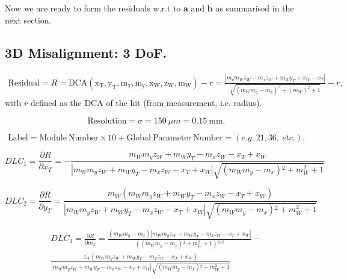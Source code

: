 \documentclass[a4paper,11pt]{article}
\begin{document}
Now we are ready to form the residuals w.r.t to $\textbf{a}$ and  $\textbf{b}$ as summarised in the next section.


\subsection{3D Misalignment: 3 DoF.}

\begin{equation}
\begin{split}
\mathrm{Residual} = R = \mathrm{DCA(x_T, y_T, m_x, m_y, x_W, z_W, m_W)} -r = \frac{| m_ym_Wz_W-m_xz_W + m_Wy_T + x_W - x_T |}{\sqrt{(m_W m_y-m_x)^2+(m_W)^2+1}} -r,
\end{split}
\end{equation}
with $r$ defined as the DCA of the hit (from measurement, i.e.  radius). 

\begin{equation}	
\mathrm{Resolution} = \sigma = 150 \ \mu m = 0.15 \ \mathrm{mm}.
\end{equation}

\begin{equation}	
\mathrm{Label}= \mathrm{Module \ Number} \times 10 + \mathrm{Global \ Parameter \ Number} = (e.g. \ 21, 36, \ etc.).
\end{equation}

\begin{equation}
DLC_1 = \frac{\partial R}{\partial x_T} =   -\frac{m_W m_y z_W+m_W y_T-m_x z_W-x_T+x_W}{|m_W m_y z_W+m_W y_T-m_x z_W-x_T+x_W|\sqrt{\left(m_W m_y-m_x\right){}^2+m_W^2+1}}
\end{equation}

\begin{equation}
DLC_2 = \frac{ \partial R}{\partial y_T} =  \frac{m_W (m_W m_y z_W+m_W y_T-m_x z_W-x_T+x_W)}{|m_W m_y z_W+m_W y_T-m_x z_W-x_T+x_W|\sqrt{\left(m_W m_y-m_x\right){}^2+m_W^2+1}} 
\end{equation}

\begin{equation}
\begin{split}
DLC_3 = \frac{ \partial R}{\partial m_x} = \frac{\left(m_W m_y-m_x\right) |m_W m_y z_W+m_W y_T-m_x z_W-x_T+x_W|}{\left(\left(m_W m_y-m_x\right){}^2+m_W^2+1\right){}^{3/2}}-\\
\frac{z_W(m_W m_y z_W+m_W y_T-m_x z_W-x_T+x_W)}{|m_W m_y z_W+m_W y_T-m_x z_W-x_T+x_W|\sqrt{\left(m_W m_y-m_x\right){}^2+m_W^2+1}}
\end{split}
\end{equation}
\end{document}
